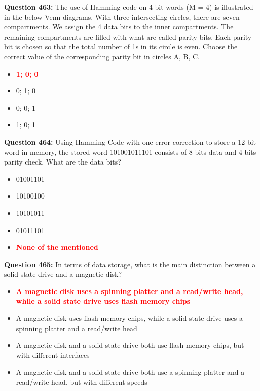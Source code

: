 \documentclass[12pt,a4paper]{article}
\begin{document}
\textbf{Question 463:} The use of Hamming code on 4-bit words (M = 4) is illustrated in the below Venn diagrams. With three intersecting circles, there are seven compartments. We assign the 4 data bits to the inner compartments. The remaining compartments are filled with what are called parity bits. Each parity bit is chosen so that the total number of 1s in its circle is even. Choose the correct value of the corresponding parity bit in circles A, B, C.

\begin{itemize}
    \item[\textbf{A.}] \textcolor{red}{\textbf{1; 0; 0}}
    \item[\textbf{B.}] 0; 1; 0
    \item[\textbf{C.}] 0; 0; 1
    \item[\textbf{D.}] 1; 0; 1
\end{itemize}

\vspace{0.5cm}

\textbf{Question 464:} Using Hamming Code with one error correction to store a 12-bit word in memory, the stored word 101001011101 consists of 8 bits data and 4 bits parity check. What are the data bits?

\begin{itemize}
    \item[\textbf{A.}] 01001101
    \item[\textbf{B.}] 10100100
    \item[\textbf{C.}] 10101011
    \item[\textbf{D.}] 01011101
    \item[\textbf{E.}] \textcolor{red}{\textbf{None of the mentioned}}
\end{itemize}

\vspace{0.5cm}

\textbf{Question 465:} In terms of data storage, what is the main distinction between a solid state drive and a magnetic disk?

\begin{itemize}
    \item[\textbf{A.}] \textcolor{red}{\textbf{A magnetic disk uses a spinning platter and a read/write head, while a solid state drive uses flash memory chips}}
    \item[\textbf{B.}] A magnetic disk uses flash memory chips, while a solid state drive uses a spinning platter and a read/write head
    \item[\textbf{C.}] A magnetic disk and a solid state drive both use flash memory chips, but with different interfaces
    \item[\textbf{D.}] A magnetic disk and a solid state drive both use a spinning platter and a read/write head, but with different speeds
\end{itemize}
\end{document}
